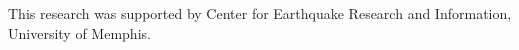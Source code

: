 \documentclass[draft]{agujournal2018}
\begin{document}
\acknowledgments
This research was supported by Center for Earthquake Research and Information, University of Memphis.





















%
%
%
%
%
%
%
%
\end{document}

